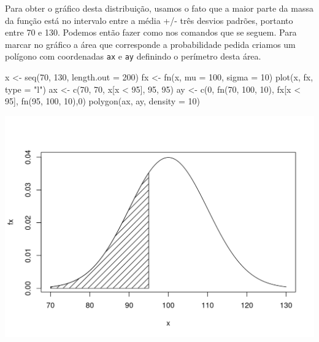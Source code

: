 \documentclass[
  10pt,
  a4paper]{book}
\newenvironment{Shaded}{\begin{snugshade}}{\end{snugshade}}
\newcommand{\AttributeTok}[1]{\textcolor[rgb]{0.77,0.63,0.00}{#1}}
\newcommand{\DecValTok}[1]{\textcolor[rgb]{0.00,0.00,0.81}{#1}}
\newcommand{\FunctionTok}[1]{\textcolor[rgb]{0.00,0.00,0.00}{#1}}
\newcommand{\NormalTok}[1]{#1}
\newcommand{\OtherTok}[1]{\textcolor[rgb]{0.56,0.35,0.01}{#1}}
\newcommand{\SpecialCharTok}[1]{\textcolor[rgb]{0.00,0.00,0.00}{#1}}
\newcommand{\StringTok}[1]{\textcolor[rgb]{0.31,0.60,0.02}{#1}}
\begin{document}
Para obter o gráfico desta distribuição, usamos o fato que
a maior parte da massa da função está no intervalo entre a média +/- três
desvios padrões, portanto entre 70 e 130. Podemos então fazer como nos
comandos que se seguem. Para marcar no gráfico a área que corresponde a
probabilidade pedida criamos um polígono com coordenadas \texttt{ax} e \texttt{ay}
definindo o perímetro desta área.

\begin{Shaded}
\begin{Highlighting}[]
\NormalTok{x }\OtherTok{\textless{}{-}} \FunctionTok{seq}\NormalTok{(}\DecValTok{70}\NormalTok{, }\DecValTok{130}\NormalTok{, }\AttributeTok{length.out =} \DecValTok{200}\NormalTok{)}
\NormalTok{fx }\OtherTok{\textless{}{-}} \FunctionTok{fn}\NormalTok{(x, }\AttributeTok{mu =} \DecValTok{100}\NormalTok{, }\AttributeTok{sigma =} \DecValTok{10}\NormalTok{)}
\FunctionTok{plot}\NormalTok{(x, fx, }\AttributeTok{type =} \StringTok{"l"}\NormalTok{)}
\NormalTok{ax }\OtherTok{\textless{}{-}} \FunctionTok{c}\NormalTok{(}\DecValTok{70}\NormalTok{, }\DecValTok{70}\NormalTok{, x[x }\SpecialCharTok{\textless{}} \DecValTok{95}\NormalTok{], }\DecValTok{95}\NormalTok{, }\DecValTok{95}\NormalTok{)}
\NormalTok{ay }\OtherTok{\textless{}{-}} \FunctionTok{c}\NormalTok{(}\DecValTok{0}\NormalTok{, }\FunctionTok{fn}\NormalTok{(}\DecValTok{70}\NormalTok{, }\DecValTok{100}\NormalTok{, }\DecValTok{10}\NormalTok{), fx[x }\SpecialCharTok{\textless{}} \DecValTok{95}\NormalTok{], }\FunctionTok{fn}\NormalTok{(}\DecValTok{95}\NormalTok{, }\DecValTok{100}\NormalTok{, }\DecValTok{10}\NormalTok{),}\DecValTok{0}\NormalTok{)}
\FunctionTok{polygon}\NormalTok{(ax, ay, }\AttributeTok{density =} \DecValTok{10}\NormalTok{)}
\end{Highlighting}
\end{Shaded}

\begin{center}\includegraphics{figures/unnamed-chunk-364-1} \end{center}
\end{document}
